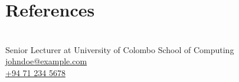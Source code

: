 \section{References}
    \resumeSubHeadingListStart
         \\[3pt]
        Senior Lecturer at University of Colombo School of Computing \\
        \href{mailto:johndoe@example.com}{\underline{johndoe@example.com}} \\
        \href{tel:+94 71 234 5678}{+94 71 234 5678}          
    \resumeSubHeadingListEnd